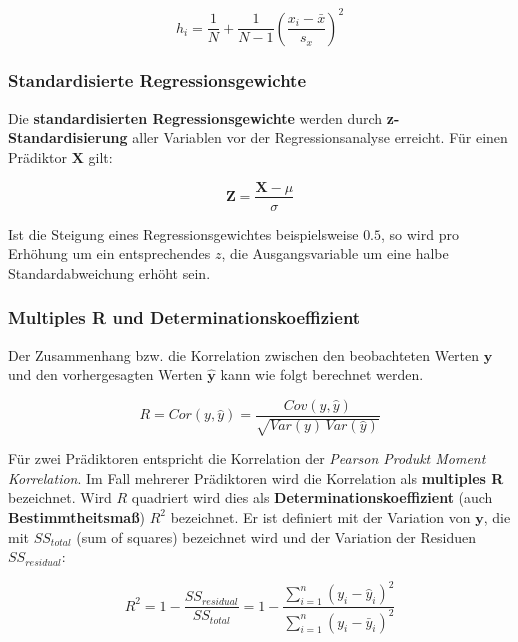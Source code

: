 \documentclass{article}
\numberwithin{equation}{section}
\begin{document}
\begin{equation}
h_i = \frac{1}{N} + \frac{1}{N-1} \left( \frac{x_i - \bar x}{s_x} \right)^2
\end{equation}

\subsubsection{Standardisierte Regressionsgewichte}

Die \textbf{standardisierten Regressionsgewichte} werden durch \textbf{z-Standardisierung} aller Variablen vor der Regressionsanalyse erreicht. Für einen Prädiktor $\mathbf{X}$ gilt:

\begin{equation}
\mathbf{Z} = \frac{\mathbf{X}-\mu}{\sigma}
\end{equation}

Ist die Steigung eines Regressionsgewichtes beispielsweise $0.5$, so wird pro Erhöhung um ein entsprechendes $z$, die Ausgangsvariable um eine halbe Standardabweichung erhöht sein.

\subsubsection{Multiples R und Determinationskoeffizient}

Der Zusammenhang bzw. die Korrelation zwischen den beobachteten Werten $\mathbf{y}$ und den vorhergesagten Werten $\mathbf{\hat y}$ kann wie folgt berechnet werden.

\begin{equation}
R = Cor(y,\hat y) = \frac{Cov(y,\hat y)}{\sqrt{Var(y)\,Var(\hat y)}}
\end{equation}

Für zwei Prädiktoren entspricht die Korrelation der \emph{Pearson Produkt Moment Korrelation}. Im Fall mehrerer Prädiktoren wird die Korrelation als \textbf{multiples R} bezeichnet. Wird $R$ quadriert wird dies als \textbf{Determinationskoeffizient} (auch \textbf{Bestimmtheitsmaß}) $R^2$ bezeichnet. Er ist definiert mit der Variation von $\mathbf{y}$, die mit $SS_{total}$ (sum of squares) bezeichnet wird und der Variation der Residuen $SS_{residual}$:

\begin{equation}
\label{eq:determinationskoeff}
R^2 = 1 - \frac{SS_{residual}}{SS_{total}} = 1 - \frac{\sum_{i=1}^n (y_i - \hat y_i)^2}{\sum_{i=1}^n (y_i - \bar y_i)^2}
\end{equation}
\end{document}
